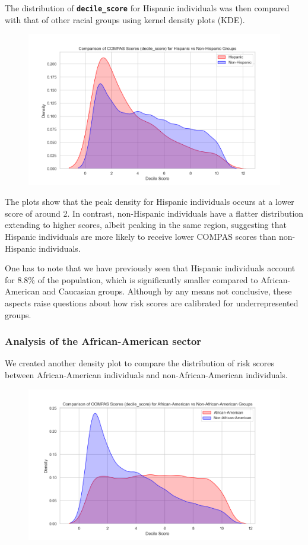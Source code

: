 The distribution of \textbf{\texttt{decile\_score}} for Hispanic individuals was then compared with that of other racial groups using kernel density plots (KDE). 

\begin{figure}
	\centering
	\includegraphics[width=0.7\linewidth]{img/decile_score_by_race_hispanic}
	\caption{}
	\label{fig:decilescorebyracehispanic}
\end{figure}


The plots show that the peak density for Hispanic individuals occurs at a lower score of around 2. In contrast, non-Hispanic individuals have a flatter distribution extending to higher scores, albeit peaking in the same region, suggesting that Hispanic individuals are more likely to receive lower COMPAS scores than non-Hispanic individuals.

One has to note that we have previously seen that Hispanic individuals account for 8.8\% of the population, which is significantly smaller compared to African-American and Caucasian groups.
Although by any means not conclusive, these aspects raise questions about how risk scores are calibrated for underrepresented groups.

\subsubsection{Analysis of the African-American sector}


We created another density plot to compare the distribution of risk scores between African-American individuals and non-African-American individuals.

\begin{figure}
	\centering
	\includegraphics[width=0.7\linewidth]{img/decile_score_by_race_african_american}
	\caption{}
	\label{fig:decilescorebyraceafricanamerican}
\end{figure}


